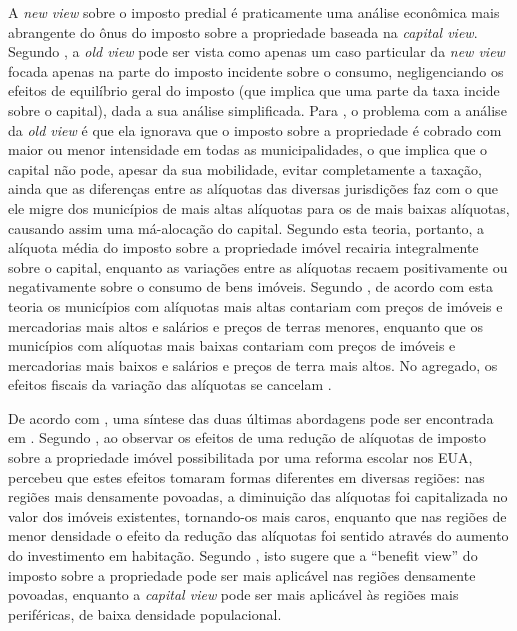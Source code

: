 \documentclass[
	12pt,				%
	oneside,			%
	a4paper,			%
	chapter=TITLE,		%
	section=TITLE,		%
	english,			%
	brazil				%
	]{abntex2}
\begin{document}
\begin{refsection}
A \emph{new view} sobre o imposto predial é praticamente uma análise econômica mais
abrangente do ônus do imposto sobre a propriedade baseada na \emph{capital view}.
Segundo \textcite[p.~8]{zodrow2001}, a \emph{old view} pode ser vista como apenas um caso
particular da \emph{new view} focada apenas na parte do imposto incidente sobre o
consumo, negligenciando os efeitos de equilíbrio geral do imposto (que implica
que uma parte da taxa incide sobre o capital), dada a sua análise simplificada.
Para \textcite[p.~6]{zodrow2001}, o problema com a análise da \emph{old view} é que ela
ignorava que o imposto sobre a propriedade é cobrado com maior ou menor
intensidade em todas as municipalidades, o que implica que o capital não pode,
apesar da sua mobilidade, evitar completamente a taxação, ainda que as
diferenças entre as alíquotas das diversas jurisdições faz com o que ele migre
dos municípios de mais altas alíquotas para os de mais baixas alíquotas,
causando assim uma má-alocação do capital. Segundo esta teoria, portanto, a
alíquota média do imposto sobre a propriedade imóvel recairia integralmente
sobre o capital, enquanto as variações entre as alíquotas recaem positivamente
ou negativamente sobre o consumo de bens imóveis. Segundo \textcite[7]{zodrow2001}, de acordo
com esta teoria os municípios com alíquotas mais altas contariam com preços de
imóveis e mercadorias mais altos e salários e preços de terras menores, enquanto
que os municípios com alíquotas mais baixas contariam com preços de imóveis e
mercadorias mais baixos e salários e preços de terra mais altos. No agregado, os
efeitos fiscais da variação das alíquotas se cancelam \autocite{oates2016}.

De acordo com \textcite{oates2016}, uma síntese das duas últimas abordagens pode ser
encontrada em \textcite{lutz}. Segundo \textcite{oates2016}, ao observar os efeitos de uma redução
de alíquotas de imposto sobre a propriedade imóvel possibilitada por uma reforma
escolar nos \gls{EUA}, \textcite{lutz} percebeu que estes efeitos tomaram formas
diferentes em diversas regiões: nas regiões mais densamente povoadas, a
diminuição das alíquotas foi capitalizada no valor dos imóveis existentes,
tornando-os mais caros, enquanto que nas regiões de menor densidade o efeito da
redução das alíquotas foi sentido através do aumento do investimento em
habitação. Segundo \textcite{oates2016}, isto sugere que a ``benefit view'' do imposto
sobre a propriedade pode ser mais aplicável nas regiões densamente povoadas,
enquanto a \emph{capital view} pode ser mais aplicável às regiões mais periféricas,
de baixa densidade populacional.


\end{refsection}
\end{document}
